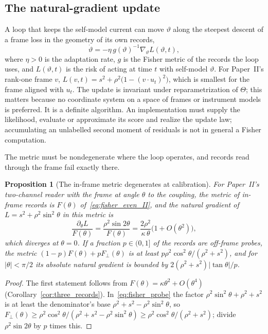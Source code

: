 \documentclass[12pt]{article}
\newtheorem{proposition}[theorem]{Proposition}
\theoremstyle{definition}
\begin{document}
\subsection{The natural-gradient update}
\label{subsec:update_law}

A loop that keeps the self-model current can move $\vartheta$ along the steepest descent of a frame loss in the geometry of its own records,
\begin{equation}
\label{eq:update_law}
\dot\vartheta=-\eta\,g(\vartheta)^{-1}\nabla_\vartheta L(\vartheta,t),
\end{equation}
where $\eta>0$ is the adaptation rate, $g$ is the Fisher metric of the records the loop uses, and $L(\vartheta,t)$ is the risk of acting at time $t$ with self-model $\vartheta$. For Paper~II's rank-one frame $v$, $L(v,t)=s^2+\rho^2\bigl(1-(v\cdot u_t)^2\bigr)$, which is smallest for the frame aligned with $u_t$. The update is invariant under reparametrization of $\Theta$; this matters because no coordinate system on a space of frames or instrument models is preferred. It is a definite algorithm. An implementation must supply the likelihood, evaluate or approximate its score and realize the update law; accumulating an unlabelled second moment of residuals is not in general a Fisher computation.

The metric must be nondegenerate where the loop operates, and records read through the frame fail exactly there.

\begin{proposition}[The in-frame metric degenerates at calibration]
\label{prop:degenerate}
For Paper~II's two-channel reader with the frame at angle $\theta$ to the coupling, the metric of in-frame records is $F(\theta)$ of~\eqref{eq:fisher_even_II}, and the natural gradient of $L=s^2+\rho^2\sin^2\theta$ in this metric is
\[
\frac{\partial_\theta L}{F(\theta)}=\frac{\rho^2\sin2\theta}{F(\theta)}=\frac{2\rho^2}{\kappa\,\theta}\bigl(1+O(\theta^2)\bigr),
\]
which diverges at $\theta=0$. If a fraction $p\in(0,1]$ of the records are off-frame probes, the metric $(1-p)F(\theta)+pF_\perp(\theta)$ is at least $p\rho^2\cos^2\theta/(\rho^2+s^2)$, and for $|\theta|<\pi/2$ its absolute natural gradient is bounded by $2(\rho^2+s^2)|\tan\theta|/p$.
\end{proposition}

\begin{proof}
The first statement follows from $F(\theta)=\kappa\theta^2+O(\theta^4)$ (Corollary~\ref{cor:three_records}). In~\eqref{eq:fisher_probe} the factor $\rho^2\sin^2\theta+\rho^2+s^2$ is at least the denominator's base $\rho^2+s^2-\rho^2\sin^2\theta$, so $F_\perp(\theta)\ge\rho^2\cos^2\theta/(\rho^2+s^2-\rho^2\sin^2\theta)\ge\rho^2\cos^2\theta/(\rho^2+s^2)$; divide $\rho^2\sin2\theta$ by $p$ times this.
\end{proof}
\end{document}
